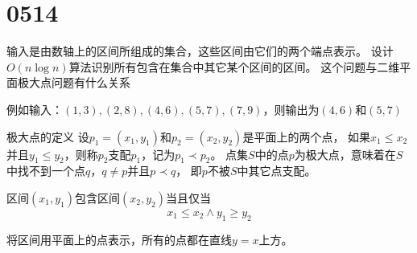 \section{0514}\label{sec:0514}
\begin{questions}
    \question 输入是由数轴上的区间所组成的集合，这些区间由它们的两个端点表示。
    设计$O(n \log n)$算法识别所有包含在集合中其它某个区间的区间。
    这个问题与二维平面极大点问题有什么关系

    例如输入：$(1,3), (2,8), (4,6), (5,7), (7,9)$，则输出为$(4,6)$和$(5,7)$

    \begin{solution}


        \textsf{极大点的定义} \quad
        {
            \kaishu
            设$p_1=(x_1,y_1)$和$p_2=(x_2,y_2)$是平面上的两个点，
            如果$x_1 \le x_2$并且$y_1 \le y_2$，则称$p_2$支配$p_1$，记为$p_1 \prec p_2$。
            点集$S$中的点$p$为极大点，意味着在$S$中找不到一个点$q$，$q \ne p$并且$p \prec q$，
            即$p$不被$S$中其它点支配。
        }

        区间$(x_1, y_1)$包含区间$(x_2, y_2)$当且仅当\[
            x_1 \le x_2 \wedge y_1 \ge y_2
        \]

        将区间用平面上的点表示，所有的点都在直线$y=x$上方。

        \begin{figure}[H]
            \centering
            \begin{subfigure}[b]{0.45\textwidth}
                \centering
\end{subfigure}
\end{figure}
\end{solution}
\end{questions}
